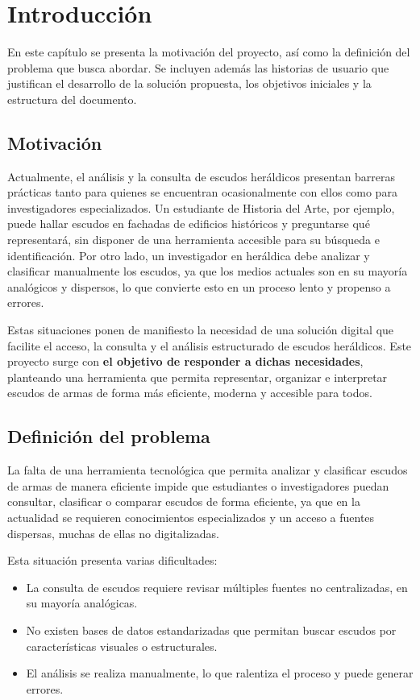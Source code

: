 \chapter{Introducción}

En este capítulo se presenta la motivación del proyecto, así como la definición
del problema que busca abordar. Se incluyen además las historias de usuario que
justifican el desarrollo de la solución propuesta, los objetivos iniciales y la
estructura del documento.

\section{Motivación}
Actualmente, el análisis y la consulta de escudos heráldicos presentan barreras
prácticas tanto para quienes se encuentran ocasionalmente con ellos como para 
investigadores especializados. Un estudiante de Historia del Arte, por ejemplo, 
puede hallar escudos en fachadas de edificios históricos y preguntarse qué representará,
sin disponer de una herramienta accesible para su búsqueda e identificación. 
Por otro lado,  un investigador en heráldica debe analizar y clasificar manualmente
los escudos, ya que los medios actuales son en su mayoría analógicos y dispersos, lo 
que convierte esto en un proceso lento y propenso a errores.

Estas situaciones ponen de manifiesto la necesidad de una solución digital que
facilite el acceso, la consulta y el análisis estructurado de escudos heráldicos. 
Este proyecto surge con \textbf{el objetivo de responder a dichas necesidades}, planteando 
una herramienta que permita representar, organizar e interpretar escudos de armas 
de forma más eficiente, moderna y accesible para todos.

\section{Definición del problema}

La falta de una herramienta tecnológica que permita analizar y clasificar escudos de 
armas de manera eficiente impide que estudiantes o investigadores puedan consultar, 
clasificar o comparar escudos de forma eficiente, ya que en la actualidad se requieren
conocimientos especializados y un acceso a fuentes dispersas, muchas de ellas no 
digitalizadas.

Esta situación presenta varias dificultades:

\begin{itemize}
    \item La consulta de escudos requiere revisar múltiples fuentes no centralizadas, 
    en su mayoría analógicas.
    \item No existen bases de datos estandarizadas que permitan buscar escudos por
    características visuales o estructurales.
    \item El análisis se realiza manualmente, lo que ralentiza el proceso y puede
    generar errores.
\end{itemize}

